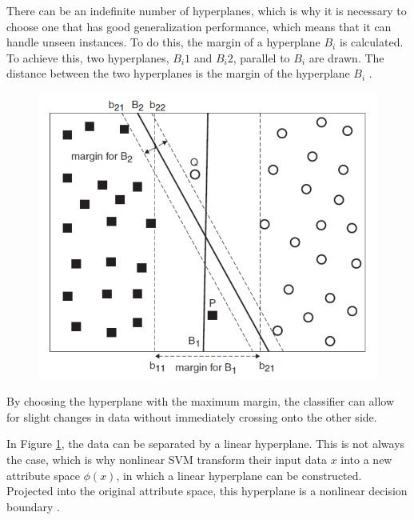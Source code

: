     There can be an indefinite number of hyperplanes, which is why it is necessary to choose one that has good generalization performance, which means that it can handle unseen instances. To do this, the margin of a hyperplane $B_i$ is calculated. To achieve this, two hyperplanes, $B_i1$ and $B_i2$, parallel to $B_i$ are drawn. The distance between the two hyperplanes is the margin of the hyperplane $B_i$ \cite{DBLP:books/aw/TanSKK2019}.
    \begin{figure}
        \centering
        \caption{
        \label{fig:svm}
        }
        \includegraphics[scale=0.8]{Images/SVM_image.png}
    \end{figure}
    
    By choosing the hyperplane with the maximum margin, the classifier can allow for slight changes in data without immediately crossing onto the other side.
    
    In Figure \ref{fig:svm}, the data can be separated by a linear hyperplane. This is not always the case, which is why nonlinear SVM transform their input data $x$ into a new attribute space $\phi(x)$, in which a linear hyperplane can be constructed. Projected into the original attribute space, this hyperplane is a nonlinear decision boundary \cite{DBLP:books/aw/TanSKK2019}.
    